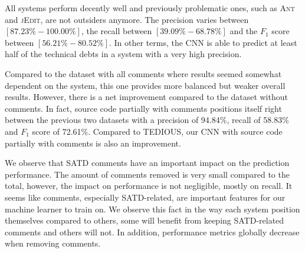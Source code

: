 
All systems perform decently well and previously problematic ones, such as \textsc{Ant} and \textsc{jEdit}, are not outsiders anymore. The precision varies between $[87.23\%-100.00\%]$, the recall between $[39.09\%-68.78\%]$ and the $F_1$ score between $[56.21\%-80.52\%]$. In other terms, the CNN is able to predict at least half of the technical debts in a system with a very high precision. 

Compared to the dataset with all comments where results seemed somewhat dependent on the system, this one provides more balanced but weaker overall results. However, there is a net improvement compared to the dataset without comments. In fact, source code partially with comments positions itself right between the previous two datasets with a precision of 94.84\%, recall of 58.83\% and $F_1$ score of 72.61\%. Compared to TEDIOUS, our CNN with source code partially with comments is also an improvement.

We observe that SATD comments have an important impact on the prediction performance. The amount of comments removed is very small compared to the total, however, the impact on performance is not negligible, mostly on recall. It seems like comments, especially SATD-related, are important features for our machine learner to train on. We observe this fact in the way each system position themselves compared to others, some will benefit from keeping SATD-related comments and others will not. In addition, performance metrics globally decrease when removing comments.


















